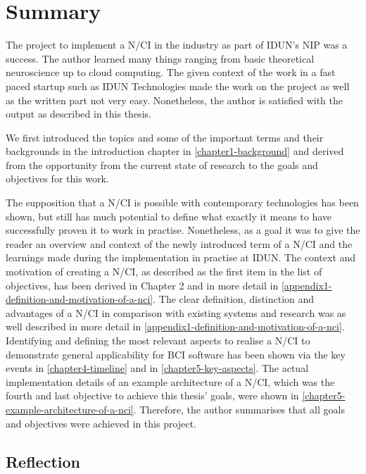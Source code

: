 \section{Summary}
\label{chapter5-summary}

The project to implement a N/CI in the industry as part of IDUN's NIP was a success. The author learned many things ranging from basic theoretical neuroscience up to cloud computing. The given context of the work in a fast paced startup such as IDUN Technologies made the work on the project as well as the written part not very easy. Nonetheless, the author is satisfied with the output as described in this thesis.

We first introduced the topics and some of the important terms and their backgrounds in the introduction chapter in \autoref{chapter1-background} and derived from the opportunity from the current state of research to the goals and objectives for this work.

The supposition that a N/CI is possible with contemporary technologies has been shown, but still has much potential to define what exactly it means to have successfully proven it to work in practise. Nonetheless, as a goal it was to give the reader an overview and context of the newly introduced term of a N/CI and the learnings made during the implementation in practise at IDUN. The context and motivation of creating a N/CI, as described as the first item in the list of objectives, has been derived in Chapter 2 and in more detail in \autoref{appendix1-definition-and-motivation-of-a-nci}. The clear definition, distinction and advantages of a N/CI in comparison with existing systems and research was as well described in more detail in \autoref{appendix1-definition-and-motivation-of-a-nci}. Identifying and defining the most relevant aspects to realise a N/CI to demonstrate general applicability for BCI software has been shown via the key events in \autoref{chapter4-timeline} and in \autoref{chapter5-key-aspects}. The actual implementation details of an example architecture of a N/CI, which was the fourth and last objective to achieve this thesis' goals, were shown in \autoref{chapter5-example-architecture-of-a-nci}. Therefore, the author summarises that all goals and objectives were achieved in this project.

\subsection{Reflection}
\label{chapter5-reflection}

